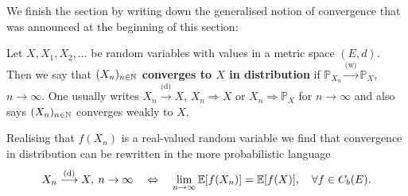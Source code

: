 We finish the section by writing down the generalised notion of convergence that was announced at the beginning of this section:
\begin{ldef}
\begin{deff}
	Let $X, X_1, X_2,...$ be random variables with values in a metric space $(E,d)$. Then we say that \textbf{$(X_n)_{n\in\mathbb{N}}$ converges to $X$ in distribution} if $\mathbb{P}_{X_n} \overset{\text{(w)}}{\longrightarrow} \mathbb{P}_{X}$, $n\to \infty$. One usually writes $X_n\overset{\text{(d)}}{\to} X$, $X_n \Rightarrow X$ or $X_n \Rightarrow \mathbb{P}_X$ for $n\to\infty$ and also says $(X_n)_{n\in\mathbb{N}}$ converges weakly to $X$. 
\end{deff}
\end{ldef}
Realising that $f(X_n)$ is a real-valued random variable we find that convergence in distribution can be rewritten in the more probabilistic language 
\begin{align*}
	X_n \overset{\text{(d)}}{\longrightarrow}X,\: n\to\infty\quad  \Leftrightarrow\quad \lim_{n\to\infty} \mathbb{E}[f(X_n)]= \mathbb{E}[f(X)],\quad \forall f\in C_b(E).
\end{align*}


